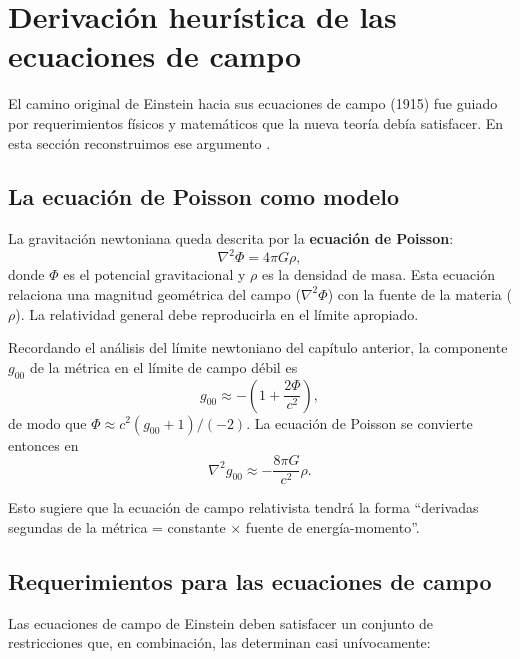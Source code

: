 \section{Derivación heurística de las ecuaciones de campo}
\label{sec:derivacion_heuristica}

El camino original de Einstein hacia sus ecuaciones de campo (1915) fue guiado por requerimientos físicos y matemáticos que la nueva teoría debía satisfacer. En esta sección reconstruimos ese argumento \cite{Carroll2004, Schutz2009}.

\subsection{La ecuación de Poisson como modelo}

La gravitación newtoniana queda descrita por la \textbf{ecuación de Poisson}:
\begin{equation}
  \nabla^2\Phi = 4\pi G\rho,
  \label{eq:Poisson}
\end{equation}
donde $\Phi$ es el potencial gravitacional y $\rho$ es la densidad de masa. Esta ecuación relaciona una magnitud geométrica del campo ($\nabla^2\Phi$) con la fuente de la materia ($\rho$). La relatividad general debe reproducirla en el límite apropiado.

Recordando el análisis del límite newtoniano del capítulo anterior, la componente $g_{00}$ de la métrica en el límite de campo débil es
\begin{equation}
  g_{00} \approx -\left(1 + \frac{2\Phi}{c^2}\right),
\end{equation}
de modo que $\Phi \approx c^2(g_{00}+1)/(-2)$. La ecuación de Poisson se convierte entonces en
\begin{equation}
  \nabla^2 g_{00} \approx -\frac{8\pi G}{c^2}\rho.
  \label{eq:Poisson_metrica}
\end{equation}

Esto sugiere que la ecuación de campo relativista tendrá la forma ``derivadas segundas de la métrica = constante × fuente de energía-momento''.

\subsection{Requerimientos para las ecuaciones de campo}

Las ecuaciones de campo de Einstein deben satisfacer un conjunto de restricciones que, en combinación, las determinan casi unívocamente:

